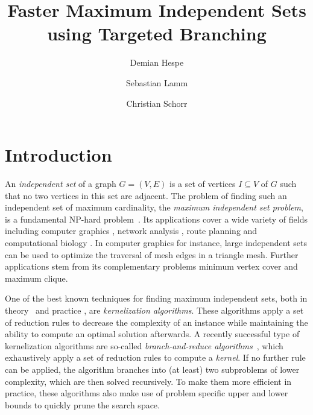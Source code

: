 \documentclass[a4paper,UKenglish,cleveref, autoref, thm-restate]{lipics-v2021}
\title{Faster Maximum Independent Sets using Targeted Branching} %
\author{Demian Hespe}{Karlsruhe Institute of Technology, Institute for
  Theoretical Informatics, Germany}{hespe@kit.edu}{https://orcid.org/0000-0001-6232-2951}{}
\author{Sebastian Lamm}{Karlsruhe Institute of Technology, Institute for
  Theoretical Informatics, Germany}{lamm@kit.edu}{}{\todo{Add funding}}
\author{Christian Schorr}{Karlsruhe Institute of Technology, Institute for
  Theoretical Informatics, Germany}{christian.schorr@student.kit.edu}{}{}
\begin{document}
\maketitle

\begin{abstract}
\end{abstract}

\newpage

\section{Introduction}

An \emph{independent set} of a graph $G = (V,E)$ is a set of vertices $I \subseteq V$ of $G$ such that no two vertices in this set are adjacent.
The problem of finding such an independent set of maximum cardinality, the \emph{maximum independent set problem}, is a fundamental NP-hard problem~\cite{Garey1974}.
Its applications cover a wide variety of fields including computer graphics \cite{CG}, network analysis \cite{NW}, route planning \cite{RP} and computational biology \cite{BIO1, BIO2}.
In computer graphics for instance, large independent sets can be used to optimize the traversal of mesh edges in a triangle mesh.
Further applications stem from its complementary problems minimum vertex cover and maximum clique.

One of the best known techniques for finding maximum independent sets, both in theory~\cite{XiaoNagamochi, ChenXiaKanj} and practice \cite{AkibaIwata}, are \emph{kernelization algorithms}.
These algorithms apply a set of reduction rules to decrease the complexity of an instance while maintaining the ability to compute an optimal solution afterwards.
A recently successful type of kernelization algorithms are so-called \emph{branch-and-reduce algorithms}~\cite{AkibaIwata,WGYC}, which exhaustively apply a set of reduction rules to compute a \emph{kernel}.
If no further rule can be applied, the algorithm branches into (at least) two subproblems of lower complexity, which are then solved recursively.
To make them more efficient in practice, these algorithms also make use of problem specific upper and lower bounds to quickly prune the search space.
\end{document}
